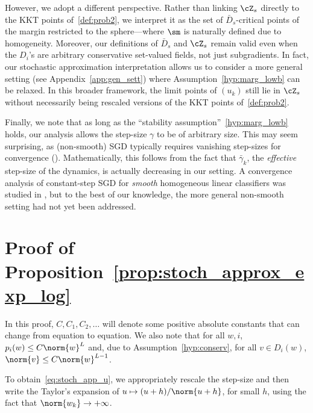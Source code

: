 However, we adopt a different perspective. Rather than linking $\cZ_s$ directly to the KKT points of~\eqref{def:prob2}, we interpret it as the set of $\bar{D}_s$-critical points of the margin restricted to the sphere—where $\sm$ is naturally defined due to homogeneity.
Moreover, our definitions of $\bar{D}_s$ and $\cZ_s$ remain valid even when the $D_i$’s are arbitrary conservative set-valued fields, not just subgradients. In fact, our stochastic approximation interpretation allows us to consider a more general setting (see Appendix~\ref{app:gen_sett}) where Assumption~\ref{hyp:marg_lowb} can be relaxed. In this broader framework, the limit points of $(u_k)$ still lie in $\cZ_s$ without necessarily being rescaled versions of the KKT points of~\eqref{def:prob2}.


Finally, we note that as long as the ``stability assumption''~\ref{hyp:marg_lowb} holds, our analysis allows the step-size \( \gamma \) to be of arbitrary  size. This may seem surprising, as (non-smooth) SGD typically requires vanishing step-sizes for convergence (\cite{majewski2018analysis,dav-dru-kak-lee-19,bolte2023subgradient,le2024nonsmooth}). Mathematically, this follows from the fact that \( \bar{\gamma}_k \), the \emph{effective} step-size of the dynamics, is actually decreasing in our setting. A convergence analysis of constant-step SGD for \emph{smooth} homogeneous linear classifiers was studied in \cite{nacson2019stochastic}, but to the best of our knowledge, the more general non-smooth setting had not yet been addressed.

\section{Proof of Proposition~\ref{prop:stoch_approx_exp_log}}\label{pf:sto_app_explog}
In this proof, $C, C_1, C_2, \ldots $ will denote some positive absolute constants that can change from equation to equation. We also note that for all $w,i$, $p_i(w) \leq C \norm{w}^L$ and, due to Assumption~\ref{hyp:conserv}, for all $v \in D_i(w)$, $\norm{v} \leq C \norm{w}^{L-1}$.

To obtain~\eqref{eq:stoch_app_u}, we appropriately rescale the step-size and then write the Taylor's expansion of $u \mapsto (u+h)/\norm{u + h}$, for small $h$, using the fact that $\norm{w_k} \rightarrow + \infty$. 

